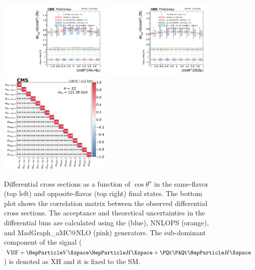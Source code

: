 \clearpage

\begin{center}
	\begin{figure}[!htb]
		\centering
		\includegraphics[width=0.48\textwidth]{Images/H4L/angles/model_v4/costhetastar_unfoldwith_4l_SM_125_asimov.pdf}
		\includegraphics[width=0.48\textwidth]{Images/H4L/angles/model_v4/costhetastar_unfoldwith_2e2mu_SM_125_asimov.pdf} \\
		\includegraphics[width=0.48\textwidth]{Images/H4L/correlations/corr_costhetastar_v4.pdf} \\
		\caption{
			Differential cross sections as a function of  $\cos \theta^\star$ in the same-flavor (top left) and opposite-flavor (top right)  final states.
			The bottom plot shows the correlation matrix between the observed differential cross sections.
			The acceptance and theoretical uncertainties in the differential bins are calculated using the \POWHEG (blue), NNLOPS (orange), and MadGraph\_aMC@NLO (pink) generators.
			The sub-dominant component of the signal ($\VBF + \VH + \ttH$) is denoted as XH and it is fixed to the SM.
			\label{fig:fidCOSTS}}
	\end{figure}
\end{center}

